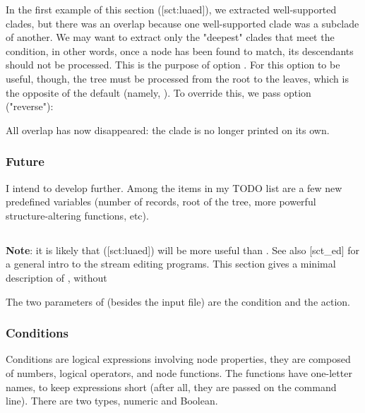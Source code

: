 
In the first example of this section (\in{}[sct:luaed]), we extracted
well-supported clades, but there was an overlap because one well-supported clade
was a subclade of another. We may want to extract only the "deepest" clades that
meet the condition, in other words, once a node has been found to match, its
descendants should not be processed. This is the purpose of option .
For this option to be useful, though, the tree must be processed from the root
to the leaves, which is the opposite of the default (namely, \no). To override
this, we pass option  ("reverse"):

\page[no]


All overlap has now disappeared: the
 clade is no longer printed on its own. 

\subsubsection{Future}

I intend to develop \luaed{} further. Among the items in my TODO list are a few
new predefined variables (number of records, root of the tree, more powerful
structure-altering functions, etc).

\subsection{\ed}

{\bf Note}: it is likely that \luaed{} (\in{}[sct:luaed]) will be more useful
than \ed. See also [sct_ed] for a general intro to the stream
editing programs. This section gives a minimal description of \ed, without

The two parameters of \ed{} (besides the input file) are the
condition and the action. 

\subsubsection{Conditions}

Conditions are logical expressions involving node properties, they are composed
of numbers, logical operators, and node functions.  The functions have
one-letter names, to keep expressions short (after all, they are passed on the
command line). There are two types, numeric and Boolean.

